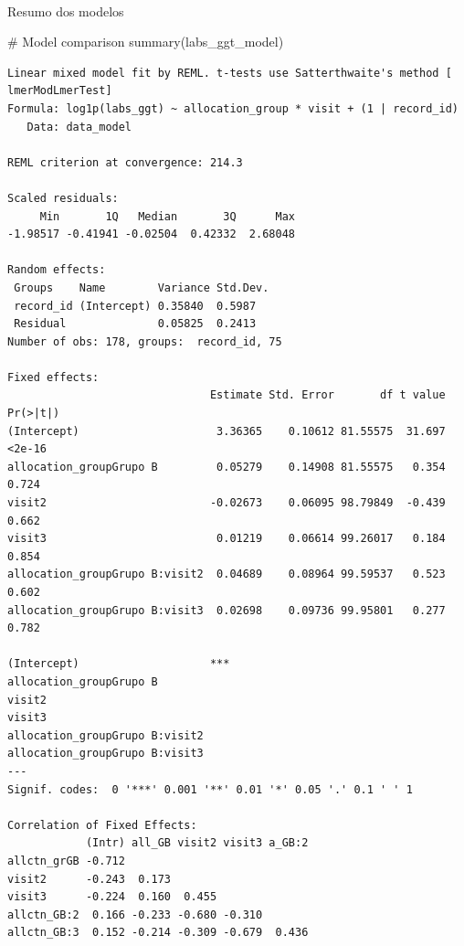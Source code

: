 \documentclass[
  letterpaper,
  DIV=11,
  numbers=noendperiod]{scrartcl}
\makeatletter
\let\oldparagraph\paragraph
\renewcommand{\paragraph}{
    \@ifstar
      \xxxParagraphStar
      \xxxParagraphNoStar
  }
\newcommand{\xxxParagraphStar}[1]{\oldparagraph*{#1}\mbox{}}
\newcommand{\xxxParagraphNoStar}[1]{\oldparagraph{#1}\mbox{}}
\newenvironment{Shaded}{\begin{snugshade}}{\end{snugshade}}
\newcommand{\CommentTok}[1]{\textcolor[rgb]{0.37,0.37,0.37}{#1}}
\newcommand{\FunctionTok}[1]{\textcolor[rgb]{0.28,0.35,0.67}{#1}}
\newcommand{\NormalTok}[1]{\textcolor[rgb]{0.00,0.23,0.31}{#1}}
\makeatother
\begin{document}
\paragraph{Resumo dos modelos}\label{resumo-dos-modelos-2}

\begin{Shaded}
\begin{Highlighting}[]
\CommentTok{\# Model comparison}
\FunctionTok{summary}\NormalTok{(labs\_ggt\_model)}
\end{Highlighting}
\end{Shaded}

\begin{verbatim}
Linear mixed model fit by REML. t-tests use Satterthwaite's method [
lmerModLmerTest]
Formula: log1p(labs_ggt) ~ allocation_group * visit + (1 | record_id)
   Data: data_model

REML criterion at convergence: 214.3

Scaled residuals: 
     Min       1Q   Median       3Q      Max 
-1.98517 -0.41941 -0.02504  0.42332  2.68048 

Random effects:
 Groups    Name        Variance Std.Dev.
 record_id (Intercept) 0.35840  0.5987  
 Residual              0.05825  0.2413  
Number of obs: 178, groups:  record_id, 75

Fixed effects:
                               Estimate Std. Error       df t value Pr(>|t|)
(Intercept)                     3.36365    0.10612 81.55575  31.697   <2e-16
allocation_groupGrupo B         0.05279    0.14908 81.55575   0.354    0.724
visit2                         -0.02673    0.06095 98.79849  -0.439    0.662
visit3                          0.01219    0.06614 99.26017   0.184    0.854
allocation_groupGrupo B:visit2  0.04689    0.08964 99.59537   0.523    0.602
allocation_groupGrupo B:visit3  0.02698    0.09736 99.95801   0.277    0.782
                                  
(Intercept)                    ***
allocation_groupGrupo B           
visit2                            
visit3                            
allocation_groupGrupo B:visit2    
allocation_groupGrupo B:visit3    
---
Signif. codes:  0 '***' 0.001 '**' 0.01 '*' 0.05 '.' 0.1 ' ' 1

Correlation of Fixed Effects:
            (Intr) all_GB visit2 visit3 a_GB:2
allctn_grGB -0.712                            
visit2      -0.243  0.173                     
visit3      -0.224  0.160  0.455              
allctn_GB:2  0.166 -0.233 -0.680 -0.310       
allctn_GB:3  0.152 -0.214 -0.309 -0.679  0.436
\end{verbatim}
\end{document}
